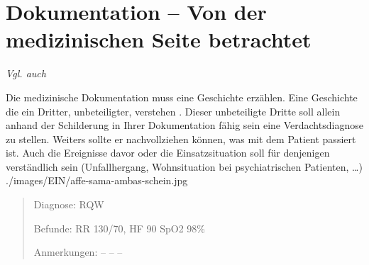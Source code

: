 






\section{Dokumentation -- Von der medizinischen Seite
betrachtet}
\label{topic:dokumentation-medizinisch}

\emph{Vgl. auch }

{Die medizinische Dokumentation muss eine Geschichte erzählen. Eine
Geschichte die ein Dritter, unbeteiligter, verstehen
. Dieser unbeteiligte Dritte soll allein anhand der
Schilderung in Ihrer Dokumentation fähig sein eine
Verdachtsdiagnose zu stellen. Weiters sollte er
nachvollziehen können, was mit dem Patient passiert ist.
Auch die Ereignisse davor oder die Einsatzsituation soll
für denjenigen verständlich sein (Unfallhergang,
Wohnsituation bei psychiatrischen Patienten, \ldots)
}{
}
{./images/EIN/affe-sama-ambas-schein.jpg}
{}
{}



\begin{quote}

{\sffamily Diagnose:} {\ttfamily\color{darkBlue} RQW}

{\sffamily Befunde:} {\sffamily RR}
{\ttfamily\color{darkBlue} 130/70,} {\sffamily HF}
{\ttfamily\color{darkBlue} 90} {\sffamily SpO2}
{\ttfamily\color{darkBlue} 98\% }

{\sffamily Anmerkungen: }{\ttfamily\color{darkBlue} -- --
--}
\end{quote}


